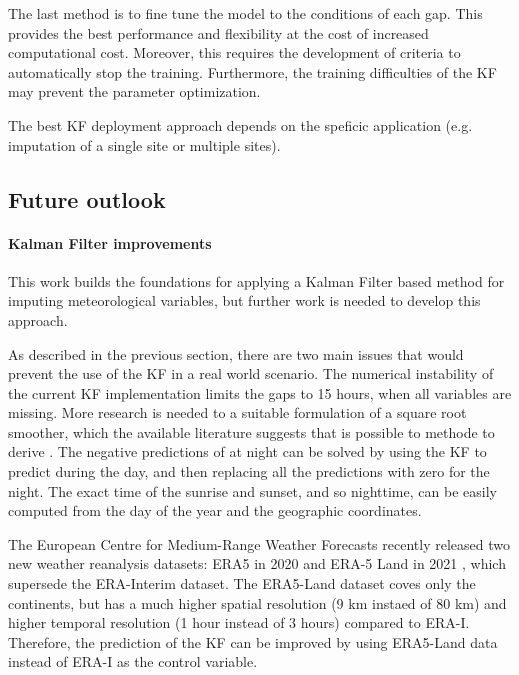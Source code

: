 \documentclass{article}
\let\Oldsubsection\subsection
\renewcommand{\subsection}{\FloatBarrier\Oldsubsection}
\begin{document}
The last method is to fine tune the model to the conditions of each gap. This provides the best performance and flexibility at the cost of increased computational cost. Moreover, this requires the development of criteria to automatically stop the training. Furthermore, the training difficulties of the KF may prevent the parameter optimization.

The best KF deployment approach depends on the speficic application (e.g. imputation of a single site or multiple sites).

\subsection{Future outlook}

\paragraph{Kalman Filter improvements} This work builds the foundations for applying a Kalman Filter based method for imputing meteorological variables, but further work is needed to develop this approach.

As described in the previous section, there are two main issues that would prevent the use of the KF in a real world scenario.
The numerical instability of the current KF implementation limits the gaps to 15 hours, when all variables are missing.
More research is needed to a suitable formulation of a square root smoother, which the available literature suggests that is possible to methode to derive \cite{rutten_square-root_2013, park_new_1996}. 
The negative predictions of  at night can be solved by using the KF to predict  during the day, and then replacing all the predictions with zero for the night. The exact time of the sunrise and sunset, and so nighttime, can be easily computed from the day of the year and the geographic coordinates.

The European Centre for Medium-Range Weather Forecasts recently released two new weather reanalysis datasets: ERA5 in 2020 \cite{hersbach_era5_2020} and ERA-5 Land  in 2021 \cite{munoz-sabater_era5-land_2021}, which supersede the ERA-Interim dataset. The ERA5-Land dataset coves only the continents, but has a much higher spatial resolution (9 km instaed of 80 km) and higher temporal resolution (1 hour instead of 3 hours) compared to ERA-I. Therefore, the prediction of the KF can be improved by using ERA5-Land data instead of ERA-I as the control variable.
\end{document}

